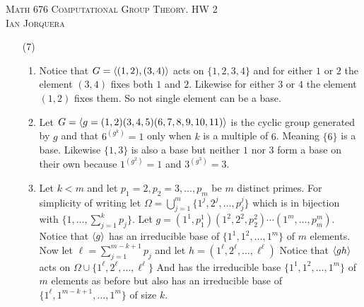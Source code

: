 \documentclass[12pt]{amsart}
\begin{document}
\begin{center}
   \textsc{Math 676 Computational Group Theory. HW 2\\ Ian Jorquera}
\end{center}
\vspace{1em}

\begin{itemize}
   \item[(7)] 
   \begin{enumerate}[label= (\alph*)]
      \item Notice that $G=\left\langle (1,2),(3,4) \right\rangle$ acts on $\{1,2,3,4\}$ and for either 
      $1$ or $2$ the element $(3,4)$ fixes both $1$ and $2$. Likewise for either 
      $3$ or $4$ the element $(1,2)$ fixes them. So not single element can be a base.

      \item Let $G=\left\langle g=(1,2)(3,4,5)(6,7,8,9,10,11) \right\rangle$ is the cyclic group generated 
      by $g$ and that $6^{(g^k)}=1$ only when $k$ is a multiple of $6$. Meaning 
      $\{6\}$ is a base. Likewise $\{1,3\}$ is also a base but neither $1$ nor $3$ 
      form a base on their own because $1^{(g^2)}=1$ and $3^{(g^3)}=3$.

      \item Let $k<m$ and let $p_1=2,p_2=3,\dots, p_m$ be $m$ distinct primes. For 
      simplicity of writing let $\Omega=\bigcup_{j=1}^m\{1^j,2^j,\dots,p_j^j\}$ 
      which is in bijection with $\{1,\dots, \sum_{j=1}^kp_j\}$. Let 
      $g=(1^1,p_1^1)(1^2,2^2,p_2^2)\cdots (1^m,\dots,p_m^m)$. Notice that $\left\langle g \right\rangle$ 
      has an irreducible base of $\{1^1,1^2,\dots, 1^m\}$ of $m$ elements. Now 
      let $\ell=\sum_{j=1}^{m-k+1}p_j$ and let $h=(1^\ell,2^\ell,\dots,\ell^\ell)$
      Notice that $\left\langle gh \right\rangle$ acts on $\Omega\cup\{1^\ell,2^\ell,\dots,\ell^\ell\}$
      And has the irreducible base $\{1^1,1^2,\dots, 1^m\}$ of $m$ elements as before
      but also has an irreducible base of $\{1^\ell,1^{m-k+1},\dots, 1^m\}$ of size $k$.



\end{enumerate}
\end{itemize}
\end{document}
